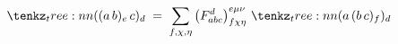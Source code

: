 \documentclass[varwidth=19cm, border=6pt]{standalone}
\begin{document}
\[
  \tntree{((a\,b)_e\,c)_d}
  \;=\;
  \sum_{f,\chi,\eta}
  \left(F_{abc}^{d}\right)_{f\chi\eta}^{e\mu\nu}\,
  \tntree{(a\,(b\,c)_f)_d}
\]
\end{document}
